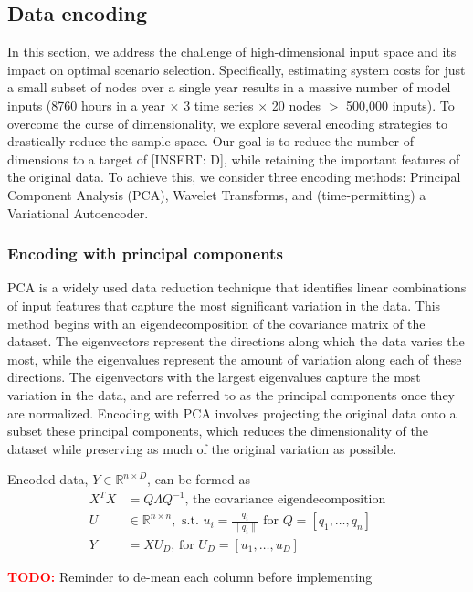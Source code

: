 \documentclass[10pt,twocolumn,letterpaper]{article}
\begin{document}
\subsection{Data encoding}
In this section, we address the challenge of high-dimensional input space and its impact on optimal scenario selection. Specifically, estimating system costs for just a small subset of nodes over a single year results in a massive number of model inputs (8760 hours in a year $\times$ 3 time series $\times$ 20 nodes $>$ 500,000 inputs). To overcome the curse of dimensionality, we explore several encoding strategies to drastically reduce the sample space. Our goal is to reduce the number of dimensions to a target of [INSERT: D], while retaining the important features of the original data. To achieve this, we consider three encoding methods: Principal Component Analysis (PCA), Wavelet Transforms, and (time-permitting) a Variational Autoencoder.

\subsubsection{Encoding with principal components}
PCA is a widely used data reduction technique that identifies linear combinations of input features that capture the most significant variation in the data. This method begins with an eigendecomposition of the covariance matrix of the dataset. The eigenvectors represent the directions along which the data varies the most, while the eigenvalues represent the amount of variation along each of these directions. The eigenvectors with the largest eigenvalues capture the most variation in the data, and are referred to as the principal components once they are normalized. Encoding with PCA involves projecting the original data onto a subset these principal components, which reduces the dimensionality of the dataset while preserving as much of the original variation as possible.

Encoded data, $Y \in \mathbb{R}^{n\times D}$, can be formed as 
\begin{align*}
    X^TX &= Q\Lambda Q^{-1} \textrm{, the covariance eigendecomposition}\\
    U &\in \mathbb{R}^{n\times n}, \textrm{ s.t. } u_i = \frac{q_i}{\lVert q_i \rVert} \textrm{ for } Q = [q_1, \dots, q_n]\\
    Y &= XU_D \textrm{, for } U_D = [u_1, \dots, u_D]
\end{align*}

\textcolor{red}{\textbf{TODO:}} Reminder to de-mean each column before implementing
\end{document}

